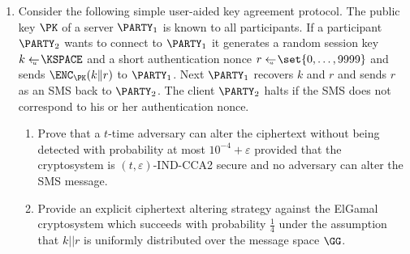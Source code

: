 \documentclass{article}
\begin{document}
\begin{enumerate}
 \item Consider the following simple user-aided key agreement
   protocol. The public key $\PK$ of a server $\PARTY_1$ is known to
   all participants. If a participant $\PARTY_2$ wants to connect to
   $\PARTY_1$ it generates a random session key $k\getsu\KSPACE$ and a
   short authentication nonce $r\getsu\set{0,\ldots,9999}$ and sends
   $\ENC_\PK(k\|r)$ to $\PARTY_1$. Next $\PARTY_1$ recovers $k$ and
   $r$ and sends $r$ as an SMS back to $\PARTY_2$. The client
   $\PARTY_2$ halts if the SMS does not correspond to his or her
   authentication nonce.
  \begin{enumerate}
  \item Prove that a $t$-time adversary can alter the ciphertext
    without being detected with probability at most
    $10^{-4}+\varepsilon$ provided that the cryptosystem is
    $(t,\varepsilon)$-IND-CCA2 secure and no adversary can alter the
    SMS message.
  \item Provide an explicit ciphertext altering strategy against
    the ElGamal cryptosystem which succeeds with probability $\frac{1}{4}$
    under the assumption that $k||r$ is uniformly distributed over the
    message space $\GG$.
  \end{enumerate}



\end{enumerate}
\end{document}
